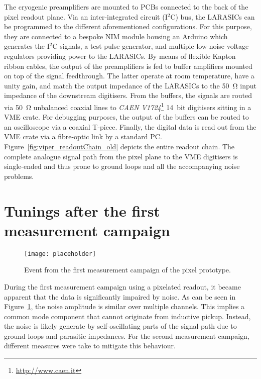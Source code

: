 The cryogenic preamplifiers are mounted to PCBs connected to the back of the pixel readout plane.
Via an inter-integrated circuit (I$^2$C) bus, the LARASICs can be programmed to the different aforementioned configurations.
For this purpose, they are connected to a bespoke NIM module housing an Arduino which generates the I$^2$C signals, a test pulse generator, and multiple low-noise voltage regulators providing power to the LARASICs.
By means of flexible Kapton ribbon cables, the output of the preamplifiers is fed to buffer amplifiers mounted on top of the signal feedthrough.
The latter operate at room temperature, have a unity gain, and match the output impedance of the LARASICs to the \SI{50}{\ohm} input impedance of the downstream digitisers.
From the buffers, the signals are routed via \SI{50}{\ohm} unbalanced coaxial lines to \emph{CAEN V1724}\footnote{\href{http://www.caen.it}{http://www.caen.it}} \SI{14}{bit} digitisers sitting in a VME crate.
For debugging purposes, the output of the buffers can be routed to an oscilloscope via a coaxial T-piece.
Finally, the digital data is read out from the VME crate via a fibre-optic link by a standard PC.
Figure~\ref{fig:viper_readoutChain_old} depicts the entire readout chain.
The complete analogue signal path from the pixel plane to the VME digitisers is single-ended and thus prone to ground loops and all the accompanying noise problems.


\section{Tunings after the first measurement campaign\label{sec:rd-dune-nd_tuning}}

\begin{figure}[htb] %
	\centering
	\texttt{[image: placeholder]}
	\caption{Event from the first measurement campaign of the pixel prototype.}
	\label{fig:viper_noisy-event}
\end{figure}

During the first measurement campaign using a pixelated readout, it became apparent that the data is significantly impaired by noise.
As can be seen in Figure~\ref{fig:viper_noisy-event}, the noise amplitude is similar over multiple channels.
This implies a common mode component that cannot originate from inductive pickup.
Instead, the noise is likely generate by self-oscillating parts of the signal path due to ground loops and parasitic impedances.
For the second measurement campaign, different measures were take to mitigate this behaviour.

